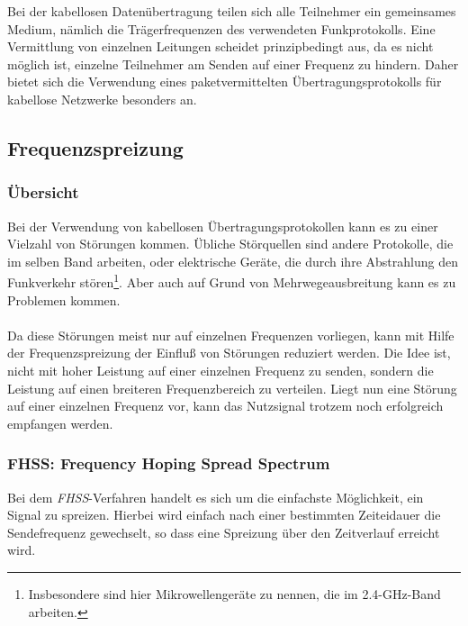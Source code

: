         Bei der kabellosen Datenübertragung teilen sich alle Teilnehmer ein gemeinsames Medium, nämlich die 
        Trägerfrequenzen des verwendeten Funkprotokolls. Eine Vermittlung von einzelnen Leitungen scheidet 
        prinzipbedingt aus, da es nicht möglich ist, einzelne Teilnehmer am Senden auf einer Frequenz zu 
        hindern. Daher bietet sich die Verwendung eines paketvermittelten Übertragungsprotokolls für kabellose
        Netzwerke besonders an.
        
    \subsection{Frequenzspreizung}
        \subsubsection{Übersicht}
            Bei der Verwendung von kabellosen Übertragungsprotokollen kann es zu einer Vielzahl von 
            Störungen kommen. Übliche Störquellen sind andere Protokolle, die im selben Band arbeiten,
            oder elektrische Geräte, die durch ihre Abstrahlung den Funkverkehr stören\footnote{Insbesondere
            sind hier Mikrowellengeräte zu nennen, die im 2.4-GHz-Band arbeiten.}. Aber auch auf Grund von 
            Mehrwegeausbreitung kann es zu Problemen kommen.\\
            \\
            Da diese Störungen meist nur auf einzelnen Frequenzen vorliegen, kann mit Hilfe der 
            Frequenzspreizung der Einfluß von Störungen reduziert werden. Die Idee ist, nicht mit
            hoher Leistung auf einer einzelnen Frequenz zu senden, sondern die Leistung auf einen
            breiteren Frequenzbereich zu verteilen. Liegt nun eine Störung auf einer einzelnen
            Frequenz vor, kann das Nutzsignal trotzem noch erfolgreich empfangen werden.

        \subsubsection{FHSS: Frequency Hoping Spread Spectrum}\label{FHSS}
            Bei dem \textsl{FHSS}-Verfahren handelt es sich um die einfachste Möglichkeit, ein
            Signal zu spreizen. Hierbei wird einfach nach einer bestimmten Zeiteidauer die
            Sendefrequenz gewechselt, so dass eine Spreizung über den Zeitverlauf erreicht wird.

